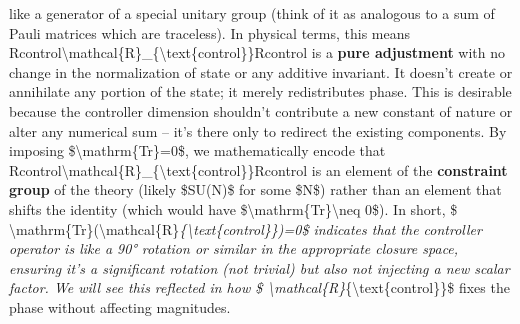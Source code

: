 \documentclass[]{article}
\begin{document}
like a generator of a special unitary group (think of it as analogous to
a sum of Pauli matrices which are traceless). In physical terms, this
means
Rcontrol\textbackslash{}mathcal\{R\}\_\{\textbackslash{}text\{control\}\}Rcontrol​
is a \textbf{pure adjustment} with no change in the normalization of
state or any additive invariant. It doesn't create or annihilate any
portion of the state; it merely redistributes phase. This is desirable
because the controller dimension shouldn't contribute a new constant of
nature or alter any numerical sum -- it's there only to redirect the
existing components. By imposing \$\textbackslash{}mathrm\{Tr\}=0\$, we
mathematically encode that
Rcontrol\textbackslash{}mathcal\{R\}\_\{\textbackslash{}text\{control\}\}Rcontrol​
is an element of the \textbf{constraint group} of the theory (likely
\$SU(N)\$ for some \$N\$) rather than an element that shifts the
identity (which would have
\$\textbackslash{}mathrm\{Tr\}\textbackslash{}neq 0\$). In short, \$
\textbackslash{}mathrm\{Tr\}(\textbackslash{}mathcal\{R\}\emph{\{\textbackslash{}text\{control\}\})=0\$
indicates that the controller operator is like a 90° rotation or similar
in the appropriate closure space, ensuring it's a significant rotation
(not trivial) but also not injecting a new scalar factor. We will see
this reflected in how \$
\textbackslash{}mathcal\{R\}}\{\textbackslash{}text\{control\}\}\$ fixes
the phase without affecting magnitudes.
\end{document}
